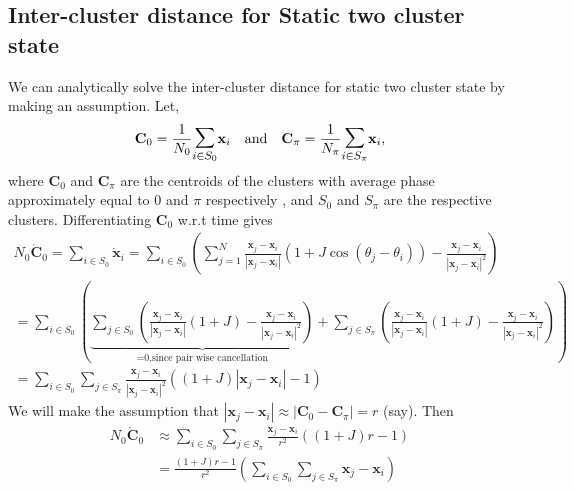 \documentclass[twocolumn,10pt]{asme2ej}
\begin{document}
{    \subsection{Inter-cluster distance for Static two cluster state}
    {
        We can analytically solve the inter-cluster distance for static two cluster state by making an assumption.
        Let,
        \begin{align} %
            \mathbf{C}_0 = \frac{1}{N_0} \mathlarger{\mathlarger{\sum}}_{i \in S_0 } \mathbf{x}_i &&\text{and}&& \mathbf{C}_\pi = \frac{1}{N_\pi} \mathlarger{\mathlarger{\sum}}_{i \in S_\pi } \mathbf{x}_i ,
        \end{align}
        where \(\mathbf{C}_0\) and \(\mathbf{C}_\pi\) are the centroids of the clusters with average phase approximately equal to \(0\) and \(\pi\) respectively , and \(S_0\) and \(S_\pi\) are the respective clusters. Differentiating \(\mathbf{C}_0\) w.r.t time gives 
        \begin{multline*}
            N_0 \dot{\mathbf{C}}_0 = \sum_{i \in S_0} \dot{\mathbf{x}}_i = \sum_{i \in S_0} \left(\sum_{j=1}^N \frac{\mathbf{x}_j - \mathbf{x}_i}{|\mathbf{x}_j - \mathbf{x}_i|} \left(1 + J \cos (\theta_j - \theta_i)\right) - \frac{\mathbf{x}_j - \mathbf{x}_i}{|\mathbf{x}_j - \mathbf{x}_i|^2}\right) \\
            = \sum_{i \in S_0} \left(\underbrace{\sum_{j \in S_0} \left(\frac{\mathbf{x}_j - \mathbf{x}_i}{|\mathbf{x}_j - \mathbf{x}_i|} \left(1 + J \right) - \frac{\mathbf{x}_j - \mathbf{x}_i}{|\mathbf{x}_j - \mathbf{x}_i|^2}\right) }_{\text{=0,since pair wise cancellation}} + \sum_{j \in S_\pi} \left(\frac{\mathbf{x}_j - \mathbf{x}_i}{|\mathbf{x}_j - \mathbf{x}_i|} \left(1 + J \right) - \frac{\mathbf{x}_j - \mathbf{x}_i}{|\mathbf{x}_j - \mathbf{x}_i|^2}\right)\right) \\
            = \sum_{i \in S_0} \sum_{j \in S_\pi} \frac{\mathbf{x}_j - \mathbf{x}_i}{|\mathbf{x}_j - \mathbf{x}_i|^2} \left((1+J) |\mathbf{x}_j - \mathbf{x}_i| - 1\right)
        \end{multline*}
        We will make the assumption that \(|\mathbf{x}_j - \mathbf{x}_i| \approx |\mathbf{C}_0 - \mathbf{C}_\pi| = r\) (say). Then
        \begin{align*}
            N_0 \dot{\mathbf{C}}_0 &\approx \sum_{i \in S_0} \sum_{j \in S_\pi} \frac{\mathbf{x}_j - \mathbf{x}_i}{r^2} \left((1+J) r - 1\right) \\
            &= \frac{(1+J) r - 1}{r^2} \left(\sum_{i \in S_0} \sum_{j \in S_\pi} \mathbf{x}_j - \mathbf{x}_i\right)

\end{align*}}}
\end{document}

